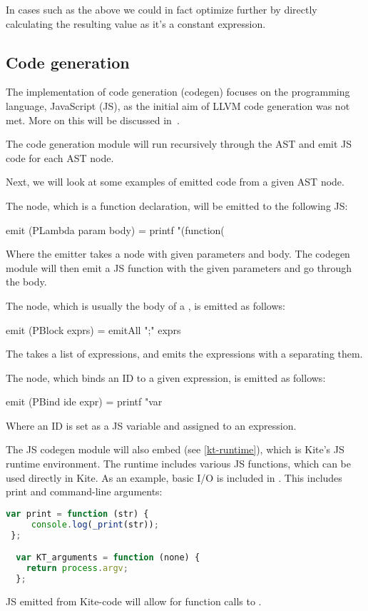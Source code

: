 In cases such as the above we could in fact optimize further by directly  calculating the resulting value as it's a constant expression.


\subsection{Code generation}
The implementation of code generation (codegen) focuses on the programming language, JavaScript (JS), as the initial aim of LLVM code generation was not met. More on this will be discussed in~.

The code generation module will run recursively through the AST and emit JS code for each AST node.

Next, we will look at some examples of emitted code from a given AST node.

The  node, which is a function declaration, will be emitted to the following JS:
\begin{haskell}
  emit (PLambda param body) = printf "(function(%
\end{haskell}

Where the emitter takes a  node with given parameters and body. The codegen module will then emit a JS function with the given parameters and go through the body.

The  node, which is usually the body of a , is emitted as follows:
\begin{haskell}
  emit (PBlock exprs) =
  emitAll ";" exprs
\end{haskell}

The  takes a list of expressions, and emits the expressions with a \code{;} separating them.

The  node, which binds an ID to a given expression, is emitted as follows:
\begin{haskell}
  emit (PBind ide expr) =
  printf "var %
\end{haskell}
Where an ID is set as a JS variable  and assigned to an expression.

The JS codegen module will also embed  (see \ref{kt-runtime}), which is Kite's JS runtime environment. The runtime includes various JS functions, which can be used directly in Kite. As an example, basic I/O is included in . This includes print and command-line arguments:
\begin{lstlisting}[language=Javascript]
  var print = function (str) {
     console.log(_print(str));
 };

  var KT_arguments = function (none) {
    return process.argv;
  };
\end{lstlisting}

JS emitted from Kite-code will allow for function calls to .
